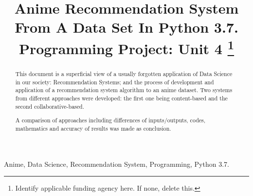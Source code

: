 \documentclass[conference]{IEEEtran}
\begin{document}
\newcommand{\SubItem}[1]{
	{\setlength\itemindent{15pt} \item[-] #1}
}
\title{Anime Recommendation System From A Data Set In Python 3.7.\\
{\footnotesize \textsuperscript{}Programming Project: Unit 4}
\thanks{Identify applicable funding agency here. If none, delete this.}
}

\author{
\and
{}
\and
{}
}

\maketitle

\begin{abstract}
This document is a superficial view of a usually forgotten application of Data Science in our society: Recommendation Systems; and the process of development and application of a recommendation system algorithm to an anime dataset. Two systems from different approaches were developed: the first one being content-based and the second collaborative-based.

A comparison of approaches including differences of inputs/outputs, codes, mathematics and accuracy of results was made as conclusion. 
 
\end{abstract}

\begin{IEEEkeywords}
Anime, Data Science, Recommendation System, Programming, Python 3.7.
\end{IEEEkeywords}
\end{document}
